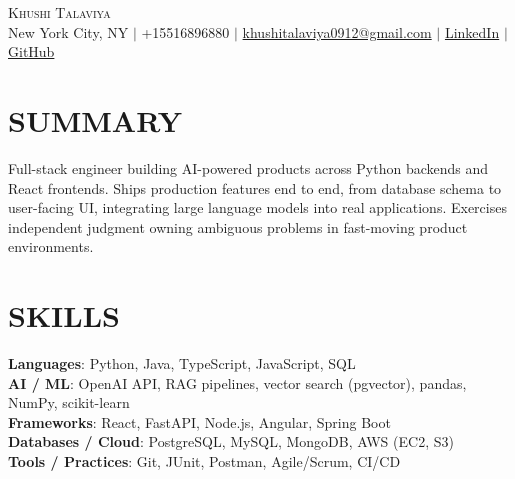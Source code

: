 \documentclass[letterpaper,11pt]{article}
\begin{document}
\begin{center}
    {\Huge \scshape Khushi Talaviya} \\ \vspace{2pt}
    \vspace{4pt}
    \small
    New York City, NY $|$
    \small
    +15516896880 $|$
    \href{mailto:khushitalaviya0912@gmail.com}{khushitalaviya0912@gmail.com} $|$
    \href{https://www.linkedin.com/in/khushitalaviya/}{LinkedIn} $|$
    \href{https://github.com/talaviyakhushi}{GitHub}
\end{center}

\section{SUMMARY}
\vspace{5pt}
\small{Full-stack engineer building AI-powered products across Python backends and React frontends. Ships production features end to end, from database schema to user-facing UI, integrating large language models into real applications. Exercises independent judgment owning ambiguous problems in fast-moving product environments.}

\vspace{2pt}
\section{SKILLS}
\vspace{5pt}
\begin{itemize}[leftmargin=0in, label={}]
\small{\item{
\textbf{Languages}{: Python, Java, TypeScript, JavaScript, SQL} \\
\textbf{AI / ML}{: OpenAI API, RAG pipelines, vector search (pgvector), pandas, NumPy, scikit-learn} \\
\textbf{Frameworks}{: React, FastAPI, Node.js, Angular, Spring Boot} \\
\textbf{Databases / Cloud}{: PostgreSQL, MySQL, MongoDB, AWS (EC2, S3)} \\
\textbf{Tools / Practices}{: Git, JUnit, Postman, Agile/Scrum, CI/CD}
}}
\end{itemize}
\vspace{-10pt}

\end{document}
